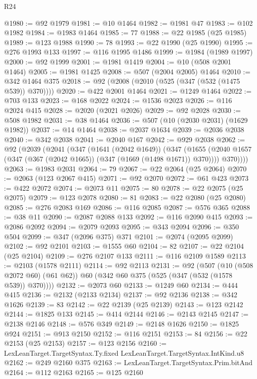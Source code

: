 \begin{lexlean}{R24}
\begin{coremodule}
@1980 := @92 @1979
@1981 := @10 @1464
@1982 := @1981 @47
@1983 := @102 @1982
@1984 := @1983 @1464
@1985 := 77
@1988 := @22 @1985 (@25 @1985)
@1989 := @123 @1988
@1990 := 78
@1993 := @22 @1990 (@25 @1990)
@1995 := @276 @1993 @133
@1997 := @116 @1995 @1486
@1999 := @1984 (@1989 @1997)
@2000 := @92 @1999
@2001 := @1981 @1419
@2004 := @10 (@508 @2001 @1464)
@2005 := @1981 @1425
@2008 := @507 (@2004 @2005) @1464
@2010 := @342 @1464 @375
@2018 := @92 (@2008 (@2010 (@525 (@347 (@532 (@1475 @539)) @370))))
@2020 := @422 @2001 @1464
@2021 := @1249 @1464
@2022 := @703 @133
@2023 := @168 @2022
@2024 := @1536 @2023
@2026 := @116 @2024 @415
@2028 := @2020 (@2021 @2026)
@2029 := @92 @2028
@2030 := @508 @1982
@2031 := @38 @1464
@2036 := @507 (@10 (@2030 @2031) (@1629 @1982))
@2037 := @14 @1464
@2038 := @2037 @1634
@2039 := @2036 @2038
@2040 := @342 @2038
@2041 := @2040 @167
@2042 := @929 @2038
@2062 := @92
    (@2039
      (@2041
        (@347
          (@1641 (@2042 @1649))
          (@347
            (@1655 (@2040 @1657 (@347 (@367 (@2042 @1665)) (@347 (@1669 (@1498 @1671)) @370))))
            @370))))
@2063 := @1983 @2031
@2064 := 79
@2067 := @22 @2064 (@25 @2064)
@2070 := @2063 (@123 @2067 @415)
@2071 := @92 @2070
@2072 := @61 @423
@2073 := @422 @2072
@2074 := @2073 @11
@2075 := 80
@2078 := @22 @2075 (@25 @2075)
@2079 := @123 @2078
@2080 := 81
@2083 := @22 @2080 (@25 @2080)
@2085 := @276 @2083 @169
@2086 := @116 @2085
@2087 := @576 @365
@2088 := @38 @11
@2090 := @2087 @2088 @133
@2092 := @116 @2090 @415
@2093 := @2086 @2092
@2094 := @2079 @2093
@2095 := @343 @2094
@2096 := @350 @504
@2099 := @347 (@2096 @375) @371
@2101 := @2074 (@2095 @2099)
@2102 := @92 @2101
@2103 := @1555 @60
@2104 := 82
@2107 := @22 @2104 (@25 @2104)
@2109 := @276 @2107 @133
@2111 := @116 @2109 @1589
@2113 := @2103 (@1578 @2111)
@2114 := @92 @2113
@2131 := @92
    (@507
      (@10 (@508 @2072 @60) (@61 @62))
      @60
      (@342 @60 @375 (@525 (@347 (@532 (@1578 @539)) @370))))
@2132 := @2073 @60
@2133 := @1249 @60
@2134 := @444 @415
@2136 := @2132 (@2133 @2134)
@2137 := @92 @2136
@2138 := @342 @1626
@2139 := 83
@2142 := @22 @2139 (@25 @2139)
@2143 := @123 @2142
@2144 := @1825 @133
@2145 := @414 @2144
@2146 := @2143 @2145
@2147 := @2138 @2146
@2148 := @576 @349
@2149 := @2148 @1626
@2150 := @1825 @924
@2151 := @913 @2150
@2152 := @116 @2151
@2153 := 84
@2156 := @22 @2153 (@25 @2153)
@2157 := @123 @2156
@2160 := LexLeanTarget.TargetSyntax.Ty.fixed LexLeanTarget.TargetSyntax.IntKind.u8
@2162 := @249 @2160 @375
@2163 := LexLeanTarget.TargetSyntax.Prim.bitAnd
@2164 := @112 @2163
@2165 := @125 @2160

\end{coremodule}
\end{lexlean}
